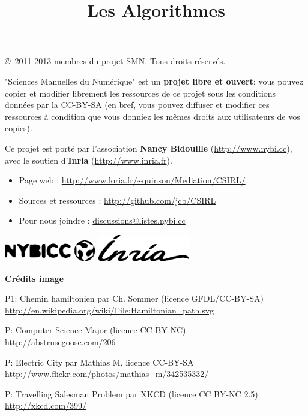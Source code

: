 \documentclass[a5paper,pagesize,DIV=14]{scrbook}
\title{Les Algorithmes}
\date{}
\begin{document}



\copyright\ 2011-2013 membres du projet SMN. Tous droits réservés.
  
"Sciences Manuelles du Numérique" est un \textbf{projet libre et ouvert}: vous
pouvez copier et modifier librement les ressources de ce projet sous les
conditions données par la CC-BY-SA (en bref, vous pouvez diffuser et modifier
ces ressources à condition que vous donniez les mêmes droits aux utilisateurs de
vos copies).

\bigskip

Ce projet est porté par l'association \textbf{Nancy Bidouille}
(\url{http://www.nybi.cc}), avec le soutien d'\textbf{Inria}
(\url{http://www.inria.fr}).
  
\bigskip

\begin{itemize}
\item Page web : \url{http://www.loria.fr/~quinson/Mediation/CSIRL/}
\item Sources et ressources : \url{http://github.com/jcb/CSIRL}
\item Pour nous joindre : \url{discussions@listes.nybi.cc}
\end{itemize}

\bigskip
\includegraphics[width=0.3\textwidth]{img/logo_nybicc.pdf}%
\includegraphics[width=0.3\textwidth]{img/logo_inria.pdf}

\vfill
\textbf{Crédits image}

{\footnotesize

P1: Chemin hamiltonien par Ch. Sommer (licence GFDL/CC-BY-SA)\\
\url{http://en.wikipedia.org/wiki/File:Hamiltonian_path.svg}

P\pageref{img:CSmajor}: Computer Science Major (licence CC-BY-NC)\\
\url{http://abstrusegoose.com/206}


P\pageref{img:electric:city}: Electric City par Mathias M, licence CC-BY-SA
\url{http://www.flickr.com/photos/mathias_m/342535332/}
  
P\pageref{img:tsp_xkcd}: Travelling Salesman Problem par XKCD (licence CC BY-NC 2.5)\\
\url{http://xkcd.com/399/}
}
\end{document}
